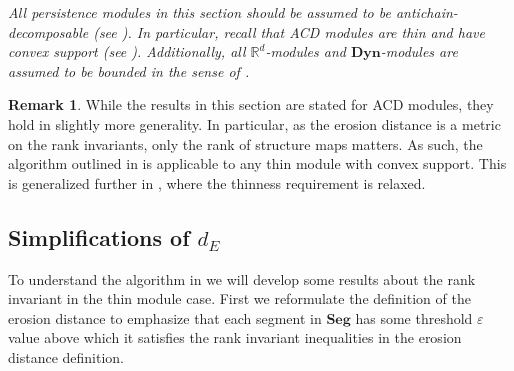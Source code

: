 \documentclass[a4paper,UKenglish,thm-restate]{article}
\theoremstyle{definition}
\newtheorem{remark}[theorem]{Remark}
\def\bdyn{\mathbf{Dyn}}
\begin{document}
    \begin{framed}
    \textit{All persistence modules in this section should be assumed to be antichain-decomposable (see ). In particular, recall that ACD modules are thin and have convex support (see ). Additionally, all $\mathbb{R}^d$-modules and $\bdyn$-modules are assumed to be bounded in the sense of .}
    \end{framed}    
    \begin{remark}
        While the results in this section are stated for ACD modules, they hold in slightly more generality. In particular, as the erosion distance is a metric on the rank invariants, only the rank of structure maps matters. As such, the algorithm outlined in  is applicable to any thin module with convex support. This is generalized further in , where the thinness requirement is relaxed.
    \end{remark}
        \subsection{Simplifications of $d_E$}

            To understand the algorithm in  we will develop some results about the rank invariant in the thin module case. First we reformulate the definition of the erosion distance to emphasize that each segment in $\mathbf{Seg}$ has some threshold $\varepsilon$ value above which it satisfies the rank invariant inequalities in the erosion distance definition.
\end{document}
